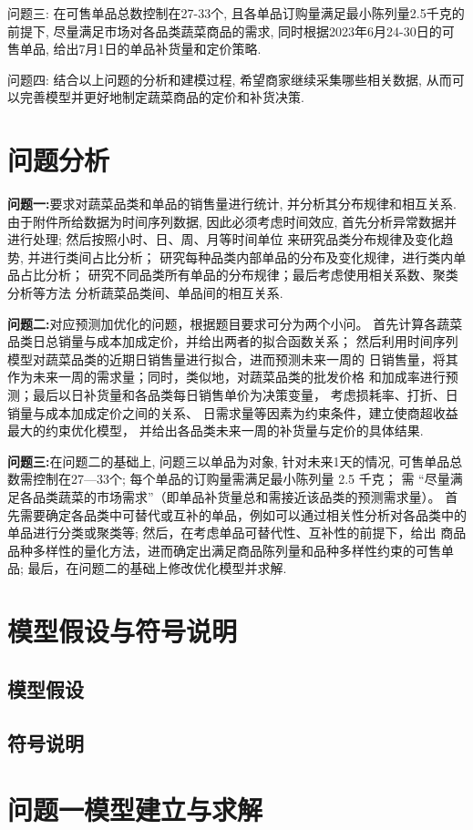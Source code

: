 \documentclass{cumcmthesis}
\begin{document}
问题三: 在可售单品总数控制在27-33个, 且各单品订购量满足最小陈列量2.5千克的前提下, 尽量满足市场对各品类蔬菜商品的需求, 同时根据2023年6月24-30日的可售单品, 给出7月1日的单品补货量和定价策略.

问题四: 结合以上问题的分析和建模过程, 希望商家继续采集哪些相关数据, 从而可以完善模型并更好地制定蔬菜商品的定价和补货决策. 
\section{问题分析}%
 \textbf{问题一:}要求对蔬菜品类和单品的销售量进行统计, 并分析其分布规律和相互关系.
由于附件所给数据为时间序列数据, 因此必须考虑时间效应,
首先分析异常数据并进行处理; 然后按照小时、日、周、月等时间单位
来研究品类分布规律及变化趋势, 并进行类间占比分析；
研究每种品类内部单品的分布及变化规律，进行类内单品占比分析；
研究不同品类所有单品的分布规律；最后考虑使用相关系数、聚类分析等方法
分析蔬菜品类间、单品间的相互关系. 

\textbf{问题二:}对应预测加优化的问题，根据题目要求可分为两个小问。
首先计算各蔬菜品类日总销量与成本加成定价，并给出两者的拟合函数关系；
然后利用时间序列模型对蔬菜品类的近期日销售量进行拟合，进而预测未来一周的
日销售量，将其作为未来一周的需求量；同时，类似地，对蔬菜品类的批发价格
和加成率进行预测；最后以日补货量和各品类每日销售单价为决策变量，
考虑损耗率、打折、日销量与成本加成定价之间的关系、
日需求量等因素为约束条件，建立使商超收益最大的约束优化模型，
并给出各品类未来一周的补货量与定价的具体结果. 

\textbf{问题三:}在问题二的基础上, 问题三以单品为对象, 针对未来1天的情况, 
可售单品总数需控制在27—33个; 每个单品的订购量需满足最小陈列量 2.5 千克；
需 “尽量满足各品类蔬菜的市场需求”（即单品补货量总和需接近该品类的预测需求量）。
首先需要确定各品类中可替代或互补的单品，例如可以通过相关性分析对各品类中的
单品进行分类或聚类等; 然后，在考虑单品可替代性、互补性的前提下，给出
商品品种多样性的量化方法，进而确定出满足商品陈列量和品种多样性约束的可售单品;
最后，在问题二的基础上修改优化模型并求解.
\section{模型假设与符号说明}%
\subsection{模型假设}
\subsection{符号说明}
\section{问题一模型建立与求解}%
\end{document}
